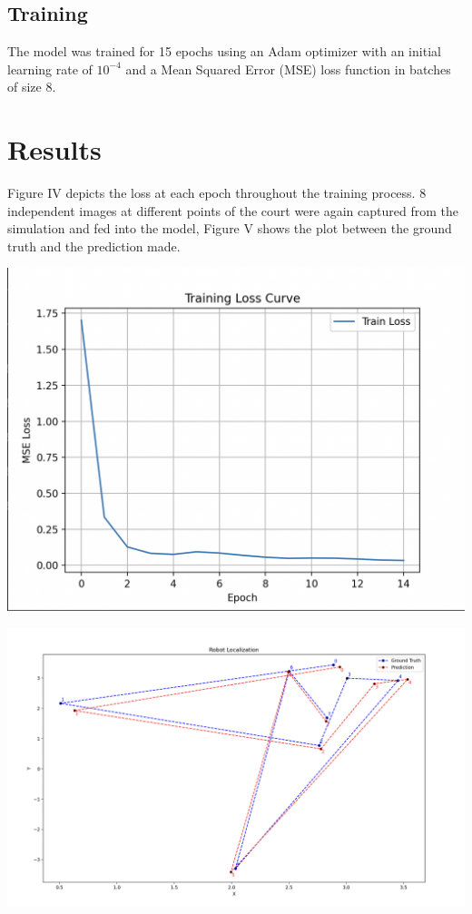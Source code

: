 \documentclass[a4paper]{article}
\begin{document}
\begin{multicols}{2}
\subsection{Training}
\par \noindent
The model was trained for 15 epochs using an Adam optimizer \cite{kingma2014adam} with an initial learning rate of $10^{-4}$
and a Mean Squared Error (MSE) loss function in batches of size 8. 

\section{Results}
\par \noindent
Figure IV depicts the loss at each epoch throughout the training process.
8 independent images at different points of the court were again captured 
from the simulation and fed into the model, Figure V shows the plot between
the ground truth and the prediction made.

{ \centering
 \includegraphics[scale=0.3]{../results/loss-epochs.png}\\
 \label{pinki}
}

{ \centering
 \includegraphics[scale=0.2]{../results/comparison.png}\\
 \label{pinki}
}



\end{multicols}
\end{document}

